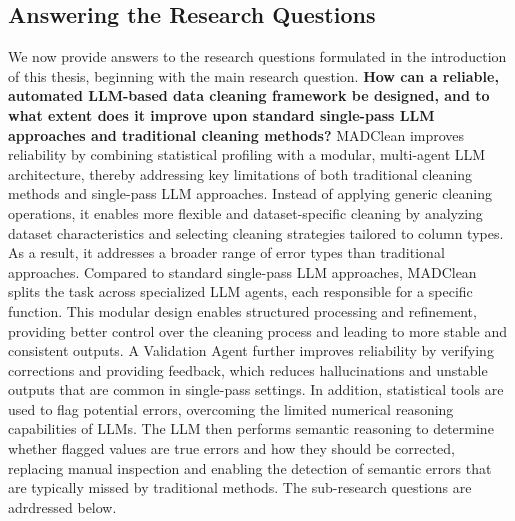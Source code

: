 \subsection{Answering the Research Questions}
We now provide answers to the research questions formulated in the introduction of this thesis, beginning with the main research question.
\newline\newline
\textbf{How can a reliable, automated LLM-based data cleaning framework be designed, and to what extent does it improve upon standard single-pass LLM approaches and traditional cleaning methods?}
\newline
MADClean improves reliability by combining statistical profiling with a modular, multi-agent LLM architecture, thereby addressing key limitations of both traditional cleaning methods and single-pass LLM approaches. 
Instead of applying generic cleaning operations, it enables more flexible and dataset-specific cleaning by analyzing dataset characteristics and selecting cleaning strategies tailored to column types. 
As a result, it addresses a broader range of error types than traditional approaches. 
Compared to standard single-pass LLM approaches, MADClean splits the task across specialized LLM agents, each responsible for a specific function. 
This modular design enables structured processing and refinement, providing better control over the cleaning process and leading to more stable and consistent outputs. 
A Validation Agent further improves reliability by verifying corrections and providing feedback, which reduces hallucinations and unstable outputs that are common in single-pass settings.
In addition, statistical tools are used to flag potential errors, overcoming the limited numerical reasoning capabilities of LLMs. 
The LLM then performs semantic reasoning to determine whether flagged values are true errors and how they should be corrected, replacing manual inspection and enabling the detection of semantic errors that are typically missed by traditional methods.
\newline\newline
The sub-research questions are adrdressed below.
